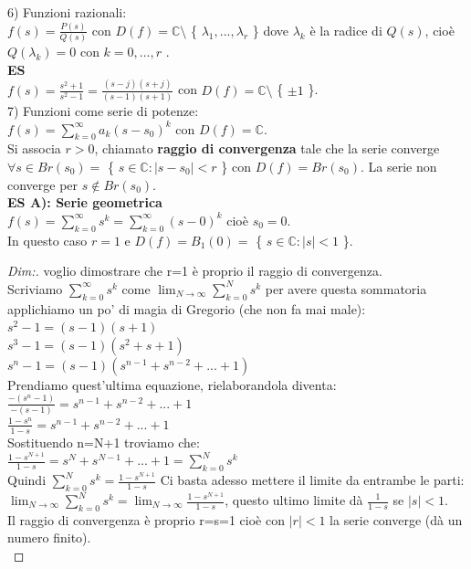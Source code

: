 6) Funzioni razionali:\\
$ f(s) = \frac{ P(s)}{Q(s)}$ con $ D(f) = \mathbb{C} \setminus$ \{ $ \lambda_{1},..., \lambda_{r}$ \} dove $ \lambda_{k}$ è la radice di $ Q(s)$, cioè $ Q( \lambda_{k})=0$ con $ k=0,...,r$ .\\

\textbf{ES}\\
$ f(s) = \frac{ s^{2}+1}{ s^{2} -1}= \frac{ (s-j)(s+j) }{ (s-1)(s+1)} $ con $ D(f) = \mathbb{C} \setminus$ \{ $ \pm 1$ \}. \\

7) Funzioni come serie di potenze:\\
$ f(s) = \sum_{k=0}^\infty a_{k} (s-s_0)^{k}$ con $ D(f)= \mathbb{C} $. \\
Si associa $r>0$, chiamato \textbf{raggio di convergenza} tale che la serie converge $ \forall s \in Br(s_0) = $ \{ $ s \in \mathbb{C} : |s-s_0| < r$ \} con $ D(f)=Br(s_0)$. La serie non converge per $ s \notin Br(s_0)$.\\

\textbf{ES A): Serie geometrica}\\
$ f(s) = \sum_{k=0}^\infty s^{k} = \sum_{k=0}^\infty (s-0)^{k}$ cioè $s_0= 0$.\\
In questo caso $r=1$ e $ D(f)=B_1(0)=$ \{ $ s \in \mathbb{C} : |s| < 1$ \}.
\begin{proof}[Dim:] voglio dimostrare che r=1 è proprio il raggio di convergenza.\\
	Scriviamo $\sum_{k=0}^\infty s^{k} $ come $ \lim_{N \to \infty} \sum_{k=0}^N s^{k} $ per avere questa sommatoria applichiamo un po' di magia di Gregorio (che non fa mai male):\\
	
	$ s^2 -1 = (s-1)(s+1)$\\
	$ s^3 -1 = (s-1)(s^2+s+1 )$\\
	$ s^n -1 = (s-1)(s^{n-1}+ s^{n-2}+...+1)$\\
	Prendiamo quest'ultima equazione, rielaborandola diventa:\\
	$ \frac{ -(s^n -1) }{-(s-1) } = s^{n-1}+ s^{n-2}+...+1$\\
	$ \frac{ 1-s^n }{ 1-s } = s^{n-1}+ s^{n-2}+...+1$\\
	Sostituendo n=N+1 troviamo che:\\
	$ \frac{ 1-s^{N+1} }{ 1-s } = s^N+ s^{N-1}+...+1 = \sum_{k=0}^N s^{k}$\\
	Quindi $ \sum_{k=0}^N s^{k} = \frac{ 1-s^{N+1} }{ 1-s } $
	Ci basta adesso mettere il limite da entrambe le parti:\\
	 $\lim_{N \to \infty} \sum_{k=0}^N s^{k} = \lim_{N \to \infty} \frac{ 1-s^{N+1} }{ 1-s } $, questo ultimo limite dà $ \frac{1}{1-s} $ se $ |s|<1$.\\
	
	Il raggio di convergenza è proprio r=s=1 cioè con $ |r| < 1$ la serie converge (dà un numero finito).\\
	
\end{proof}

